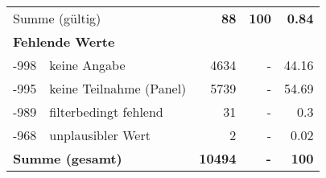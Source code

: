 \begin{longtable}{lXrrr}
     \midrule
     \multicolumn{2}{l}{Summe (gültig)} &
       \textbf{\num{88}} &
     \textbf{\num{100}} &
       \textbf{\num[round-mode=places,round-precision=2]{0.84}} \\
     \multicolumn{5}{l}{\textbf{Fehlende Werte}}\\
       -998 &
       keine Angabe &
         \num{4634} &
        - &
         \num[round-mode=places,round-precision=2]{44.16} \\
       -995 &
       keine Teilnahme (Panel) &
         \num{5739} &
        - &
         \num[round-mode=places,round-precision=2]{54.69} \\
       -989 &
       filterbedingt fehlend &
         \num{31} &
        - &
         \num[round-mode=places,round-precision=2]{0.3} \\
       -968 &
       unplausibler Wert &
         \num{2} &
        - &
         \num[round-mode=places,round-precision=2]{0.02} \\
     \midrule
     \multicolumn{2}{l}{\textbf{Summe (gesamt)}} &
          \textbf{\num{10494}} &
        \textbf{-} &
        \textbf{\num{100}} \\
     \bottomrule
     \end{longtable}
     
